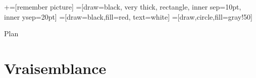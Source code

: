 \usetikzlibrary{positioning}
\usetikzlibrary{snakes}
\usetikzlibrary{calc}
\usetikzlibrary{arrows}
\usetikzlibrary{decorations.markings}
\usetikzlibrary{shapes.misc}
\usetikzlibrary{matrix,shapes,arrows,fit,tikzmark}
\usetikzlibrary{shapes}
\newcommand\marktopleft[1]{%
    \tikz[overlay,remember picture] 
        \node (marker-#1-a) at (-.3em,.3em) {};%
}
\newcommand\markbottomright[2]{%
    \tikz[overlay,remember picture] 
        \node (marker-#1-b) at (0em,0em) {};%
}
+=[remember picture] 
 =[draw=black, very thick, rectangle, inner sep=10pt, inner ysep=20pt]
 =[draw=black,fill=red, text=white]
=[draw,circle,fill=gray!50]



\begin{frame}
\titlepage
\end{frame}
\begin{frame}{Plan}
 \tableofcontents
    \end{frame}



\section{Vraisemblance}
\frame{\sectionpage}

